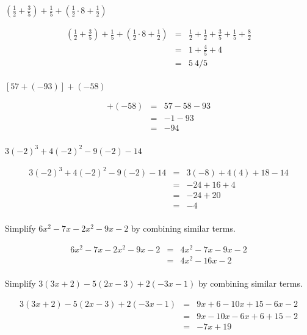 \documentclass[fleqn,addpoints]{exam}
\begin{document}
\begin{questions}
\question[5]
\( \displaystyle
( \frac{1}{2} + \frac{3}{5} ) + \frac{1}{5} + (\frac{1}{2} \cdot 8 + \frac{1}{2})
\)
\begin{solution}[3 cm]
  \begin{eqnarray*}
    (\frac{1}{2} + \frac{3}{5} ) + \frac{1}{5} + (\frac{1}{2} \cdot 8 + \frac{1}{2})
      & = & \frac{1}{2} + \frac{1}{2} + \frac{3}{5} + \frac{1}{5} + \frac{8}{2} \\
      & = & 1 + \frac{4}{5} + 4 \\
      & = & 5\ 4/5 \\
  \end{eqnarray*}
\end{solution}

\question[5]
\(
  [57 + (-93)] + (-58)
\)
\begin{solution}[3 cm]
  \begin{eqnarray*}
    [57 + (-93)] + (-58)
      & = & 57 - 58 - 93 \\
      & = & -1 - 93 \\
      & = & -94 \\
  \end{eqnarray*}
\end{solution}

\question[5]
\(
  3(-2)^3 + 4(-2)^2 -9(-2) - 14
\)
\begin{solution}[3 cm]
  \begin{eqnarray*}
    3(-2)^3 + 4(-2)^2 -9(-2) - 14
      & = & 3(-8) + 4(4) + 18 - 14 \\
      & = & -24 + 16 + 4 \\
      & = & -24 + 20 \\
      & = & -4 \\
  \end{eqnarray*}
\end{solution}

\question[5] Simplify \( 6x^2 - 7x - 2x^2 - 9x - 2 \) by combining similar terms.
\begin{solution}[3 cm]
  \begin{eqnarray*}
    6x^2 - 7x - 2x^2 - 9x - 2
      & = & 4x^2 -7x -9x -2 \\
      & = & 4x^2 -16x -2 \\
  \end{eqnarray*}
\end{solution}

\question[5] \label{ne:last} Simplify \( 3(3x + 2) -5(2x - 3) + 2(-3x - 1) \) by combining similar terms.
\begin{solution}[3 cm]
  \begin{eqnarray*}
    3(3x + 2) -5(2x - 3) + 2(-3x - 1)
      & = & 9x + 6 - 10x + 15 - 6x - 2 \\
      & = & 9x -10x - 6x + 6 + 15 - 2 \\
      & = & -7x + 19 \\
  \end{eqnarray*}
\end{solution}



\end{questions}
\end{document}
